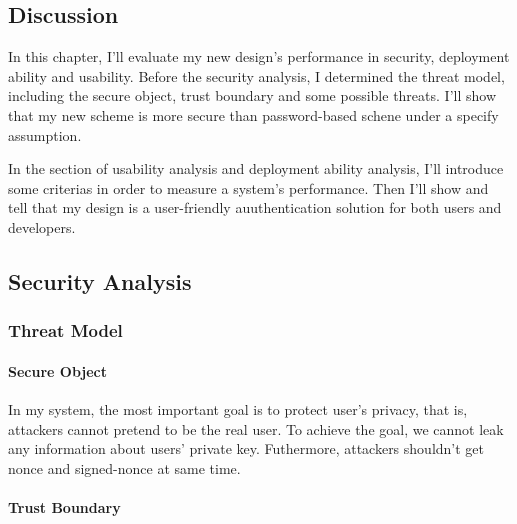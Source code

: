 \begin{CJK}{Bg5}{bsmi}


\chapter{Discussion}

In this chapter, I'll evaluate my new design's performance in security, deployment ability and usability. Before the security analysis, I determined the threat model, including the secure object, trust boundary and some possible threats. I'll show that my new scheme is more secure than password-based schene under a specify assumption.

In the section of usability analysis and deployment ability analysis, I'll introduce some criterias in order to measure a system's performance. Then I'll show and tell that my design is a user-friendly auuthentication solution for both users and developers.

\section{Security Analysis}

\subsection{Threat Model}

\subsubsection{Secure Object}

In my system, the most important goal is to protect user's privacy, that is, attackers cannot pretend to be the real user. To achieve the goal, we cannot leak any information about users' private key. Futhermore, attackers shouldn't get nonce and signed-nonce at same time.

\begin{comment}
[TODO]
enumerate the secure objectives
ADD CONCLUSION!!
\end{comment}

\subsubsection{Trust Boundary}


\end{CJK}
